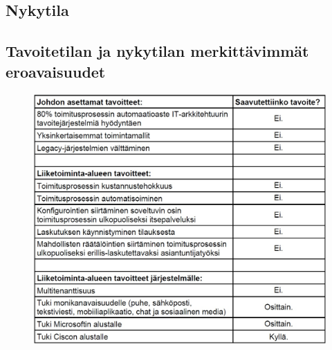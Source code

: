 \documentclass[finnish,12pt,a4paper,pdftex]{article}
\begin{document}
\subsection{Nykytila}

\subsection{Tavoitetilan ja nykytilan merkittävimmät eroavaisuudet}

\begin{figure}[!h]
    \centering
    \includegraphics[scale=0.3]{images/eroavaisuudet.jpg}
    \label{fig:tavoitteet}
\end{figure}


\end{document}
